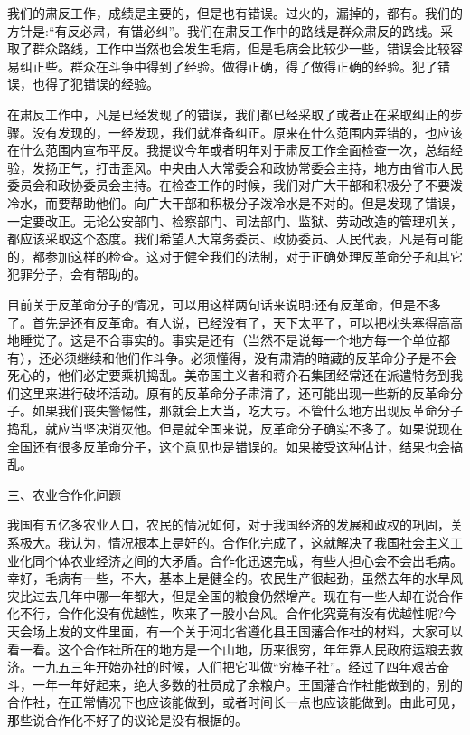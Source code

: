 \documentclass[UTF8, 12pt, a4paper]{ctexrep}
\begin{document}
我们的肃反工作，成绩是主要的，但是也有错误。过火的，漏掉的，都有。我们的方针是:“有反必肃，有错必纠”。我们在肃反工作中的路线是群众肃反的路线。采取了群众路线，工作中当然也会发生毛病，但是毛病会比较少一些，错误会比较容易纠正些。群众在斗争中得到了经验。做得正确，得了做得正确的经验。犯了错误，也得了犯错误的经验。

在肃反工作中，凡是已经发现了的错误，我们都已经采取了或者正在采取纠正的步骤。没有发现的，一经发现，我们就准备纠正。原来在什么范围内弄错的，也应该在什么范围内宣布平反。我提议今年或者明年对于肃反工作全面检查一次，总结经验，发扬正气，打击歪风。中央由人大常委会和政协常委会主持，地方由省市人民委员会和政协委员会主持。在检查工作的时候，我们对广大干部和积极分子不要泼冷水，而要帮助他们。向广大干部和积极分子泼冷水是不对的。但是发现了错误，一定要改正。无论公安部门、检察部门、司法部门、监狱、劳动改造的管理机关，都应该采取这个态度。我们希望人大常务委员、政协委员、人民代表，凡是有可能的，都参加这样的检查。这对于健全我们的法制，对于正确处理反革命分子和其它犯罪分子，会有帮助的。

目前关于反革命分子的情况，可以用这样两句话来说明:还有反革命，但是不多了。首先是还有反革命。有人说，已经没有了，天下太平了，可以把枕头塞得高高地睡觉了。这是不合事实的。事实是还有（当然不是说每一个地方每一个单位都有），还必须继续和他们作斗争。必须懂得，没有肃清的暗藏的反革命分子是不会死心的，他们必定要乘机捣乱。美帝国主义者和蒋介石集团经常还在派遣特务到我们这里来进行破坏活动。原有的反革命分子肃清了，还可能出现一些新的反革命分子。如果我们丧失警惕性，那就会上大当，吃大亏。不管什么地方出现反革命分子捣乱，就应当坚决消灭他。但是就全国来说，反革命分子确实不多了。如果说现在全国还有很多反革命分子，这个意见也是错误的。如果接受这种估计，结果也会搞乱。

三、农业合作化问题

我国有五亿多农业人口，农民的情况如何，对于我国经济的发展和政权的巩固，关系极大。我认为，情况根本上是好的。合作化完成了，这就解决了我国社会主义工业化同个体农业经济之间的大矛盾。合作化迅速完成，有些人担心会不会出毛病。幸好，毛病有一些，不大，基本上是健全的。农民生产很起劲，虽然去年的水旱风灾比过去几年中哪一年都大，但是全国的粮食仍然增产。现在有一些人却在说合作化不行，合作化没有优越性，吹来了一股小台风。合作化究竟有没有优越性呢?今天会场上发的文件里面，有一个关于河北省遵化县王国藩合作社的材料，大家可以看一看。这个合作社所在的地方是一个山地，历来很穷，年年靠人民政府运粮去救济。一九五三年开始办社的时候，人们把它叫做“穷棒子社”。经过了四年艰苦奋斗，一年一年好起来，绝大多数的社员成了余粮户。王国藩合作社能做到的，别的合作社，在正常情况下也应该能做到，或者时间长一点也应该能做到。由此可见，那些说合作化不好了的议论是没有根据的。
\end{document}
